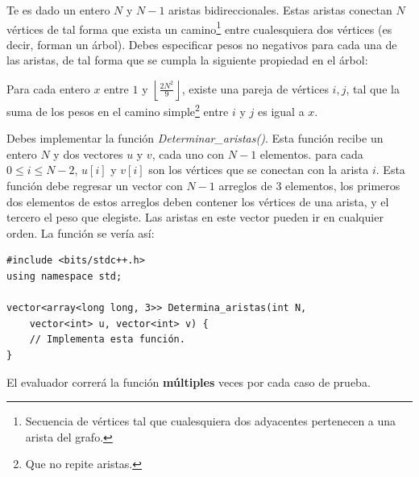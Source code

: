 \documentclass[12pt]{scrartcl}
\begin{document}
    
    
    \vspace{10pt}

    
    
        Te es dado un entero $N$ y $N - 1$ aristas bidireccionales. Estas aristas conectan $N$ vértices de tal forma que exista un camino\footnote{Secuencia de vértices tal que cualesquiera dos adyacentes pertenecen a una arista del grafo.} entre cualesquiera dos vértices (es decir, forman un árbol). Debes especificar pesos no negativos para cada una de las aristas, de tal forma que se cumpla la siguiente propiedad en el árbol:
        
        Para cada entero $x$ entre $1$ y $\left\lfloor \frac{2N^2}{9} \right\rfloor$, existe una pareja de vértices $i, j$, tal que la suma de los pesos en el camino simple\footnote{Que no repite aristas.} entre $i$ y $j$ es igual a $x$.
    

        Debes implementar la función \textit{Determinar\_aristas()}. Esta función recibe un entero $N$ y dos vectores $u$ y $v$, cada uno con $N - 1$ elementos. para cada $0 \le i \le N - 2$, $u[i]$ y $v[i]$ son los vértices que se conectan con la arista $i$. Esta función debe regresar un vector con $N - 1$ arreglos de 3 elementos, los primeros dos elementos de estos arreglos deben contener los vértices de una arista, y el tercero el peso que elegiste. Las aristas en este vector pueden ir en cualquier orden.
        La función se vería así:

\begin{verbatim}
#include <bits/stdc++.h>
using namespace std;

vector<array<long long, 3>> Determina_aristas(int N,
    vector<int> u, vector<int> v) {
    // Implementa esta función.
}
\end{verbatim}

    El evaluador correrá la función \textbf{múltiples} veces por cada caso de prueba.

    
\end{document}
